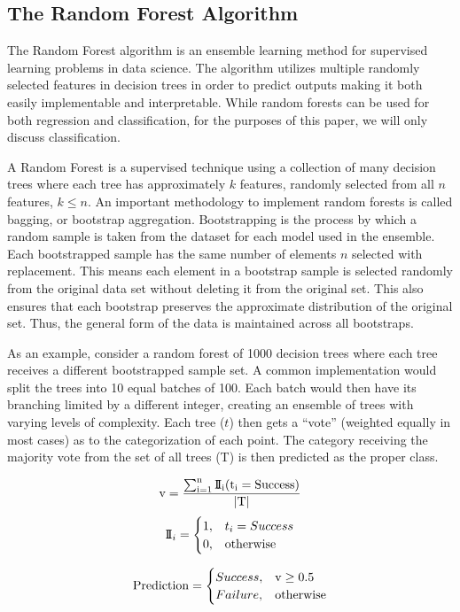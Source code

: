 \subsection{The Random Forest Algorithm}
The Random Forest algorithm is an ensemble learning method for supervised learning problems in data science. The algorithm utilizes multiple randomly selected features in decision trees in order to predict outputs making it both easily implementable and interpretable. While random forests can be used for both regression and classification, for the purposes of this paper, we will only discuss classification.

A Random Forest is a supervised technique using a collection of many decision trees where each tree has approximately $k$ features, randomly selected from all $n$ features, $k \leq n$. An important methodology to implement random forests is called bagging, or bootstrap aggregation. Bootstrapping is the process by which a random sample is taken from the dataset for each model used in the ensemble. Each bootstrapped sample has the same number of elements $n$ selected with replacement. This means each element in a bootstrap sample is selected randomly from the original data set without deleting it from the original set. This also ensures that each bootstrap preserves the approximate distribution of the original set. Thus, the general form of the data is maintained across all bootstraps.

As an example, consider a random forest of 1000 decision trees where each tree receives a different bootstrapped sample set. A common implementation would split the trees into 10 equal batches of 100. Each batch would then have its branching limited by a different integer, creating an ensemble of trees with varying levels of complexity. Each tree ($t$) then gets a ``vote'' (weighted equally in most cases) as to the categorization of each point. The category receiving the majority vote from the set of all trees (T) is then predicted as the proper class. 

$$\rm{v} = \frac{\sum_{i = 1}^n {\rm I\!I}_{i}(t_{i} = Success)}{|T|}$$ 
\[ {\rm I\!I}_{i} =  \begin{cases} 
      1, & t_{i} = Success \\
      0, & \rm{otherwise}
   \end{cases}
\]

\[ \rm{Prediction} =  \begin{cases} 
      Success, & \rm{v}\geq0.5 \\
      Failure, & \rm{otherwise}
   \end{cases}
\]

